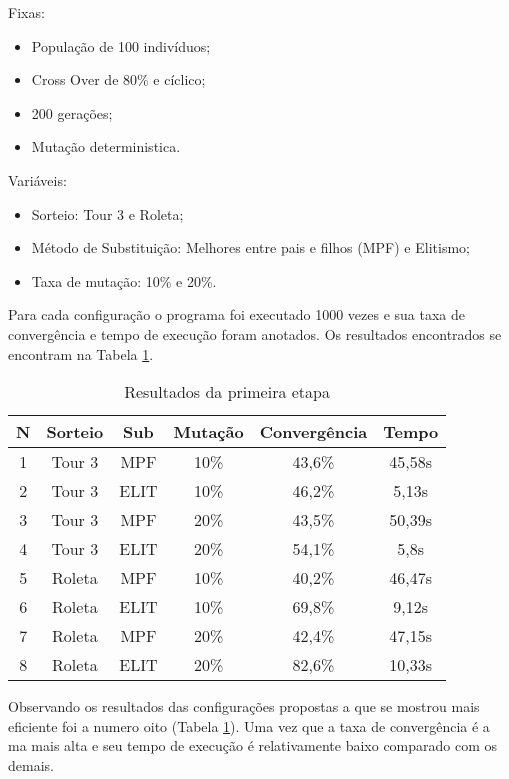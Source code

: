\documentclass[a4paper, 12pt]{article}
\begin{document}
    Fixas:
    \begin{itemize}
    \item População de 100 indivíduos;
    \item Cross Over de 80\% e cíclico;
    \item 200 gerações;
    \item Mutação deterministica.
    \end{itemize}

    Variáveis:
    \begin{itemize}
    \item Sorteio: Tour 3 e Roleta;
    \item Método de Substituição: Melhores entre pais e filhos (MPF) e Elitismo;
    \item Taxa de mutação: 10\% e 20\%.
    \end{itemize}

    Para cada configuração o programa foi executado 1000 vezes e sua taxa de
     convergência e tempo de execução foram anotados. Os resultados encontrados
     se encontram na Tabela \ref{tab:etapa1}.

    \begin{table}[h]
      \centering
      \begin{tabular}{|c|c|c|c|c|c|}
        \hline
        N & Sorteio & Sub & Mutação & Convergência & Tempo \\
        \hline
        1 & Tour 3 & MPF & 10\% & 43,6\% & 45,58s \\
        \hline
        2 & Tour 3 & ELIT & 10\% & 46,2\% & 5,13s \\
        \hline
        3 & Tour 3 & MPF & 20\% & 43,5\% & 50,39s \\
        \hline
        4 & Tour 3 & ELIT & 20\% & 54,1\% & 5,8s \\
        \hline
        5 & Roleta & MPF & 10\% & 40,2\% & 46,47s \\
        \hline
        6 & Roleta & ELIT & 10\% & 69,8\% & 9,12s \\
        \hline
        7 & Roleta & MPF & 20\% & 42,4\% & 47,15s \\
        \hline
        8 & Roleta & ELIT & 20\% & 82,6\% & 10,33s \\
        \hline
      \end{tabular}
      \caption{Resultados da primeira etapa}
      \label{tab:etapa1}
    \end{table}

  Observando os resultados das configurações propostas a que se mostrou mais
  eficiente foi a numero oito (Tabela \ref{tab:etapa1}). Uma vez que a taxa de convergência é a
  ma mais alta e seu tempo de execução é relativamente baixo comparado com os demais.
\end{document}
